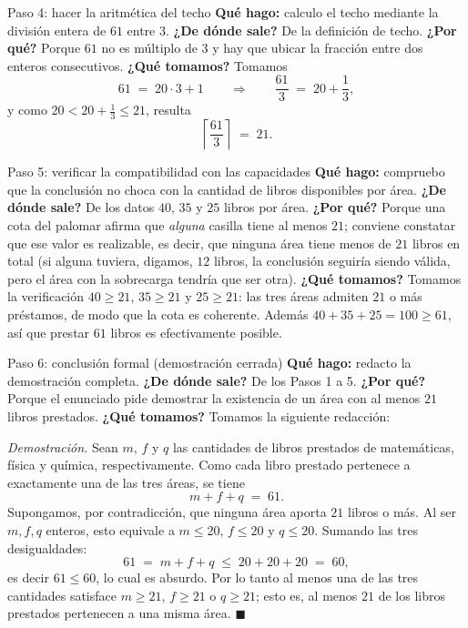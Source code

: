 \documentclass[11pt]{article}
\begin{document}
\begin{sol}
\begin{paso}{Paso 4: hacer la aritm\'etica del techo}
\textbf{Qu\'e hago:} calculo el techo mediante la divisi\'on entera de $61$ entre $3$.
\textbf{¿De d\'onde sale?} De la definici\'on de techo.
\textbf{¿Por qu\'e?} Porque $61$ no es m\'ultiplo de $3$ y hay que ubicar la fracci\'on entre dos enteros consecutivos.
\textbf{¿Qu\'e tomamos?} Tomamos
\[
61 \;=\; 20\cdot 3 + 1
\qquad\Longrightarrow\qquad
\frac{61}{3} \;=\; 20 + \frac{1}{3} ,
\]
y como $20 < 20+\tfrac{1}{3} \le 21$, resulta
\[
\left\lceil \frac{61}{3} \right\rceil \;=\; 21 .
\]
\end{paso}

\begin{paso}{Paso 5: verificar la compatibilidad con las capacidades}
\textbf{Qu\'e hago:} compruebo que la conclusi\'on no choca con la cantidad de libros disponibles por \'area.
\textbf{¿De d\'onde sale?} De los datos $40$, $35$ y $25$ libros por \'area.
\textbf{¿Por qu\'e?} Porque una cota del palomar afirma que \emph{alguna} casilla tiene al menos $21$; conviene constatar que ese valor es realizable, es decir, que ninguna \'area tiene menos de $21$ libros en total (si alguna tuviera, digamos, $12$ libros, la conclusi\'on seguir\'ia siendo v\'alida, pero el \'area con la sobrecarga tendr\'ia que ser otra).
\textbf{¿Qu\'e tomamos?} Tomamos la verificaci\'on $40\ge 21$, $35\ge 21$ y $25\ge 21$: las tres \'areas admiten $21$ o m\'as pr\'estamos, de modo que la cota es coherente. Adem\'as $40+35+25=100\ge 61$, as\'i que prestar $61$ libros es efectivamente posible.
\end{paso}

\begin{paso}{Paso 6: conclusi\'on formal (demostraci\'on cerrada)}
\textbf{Qu\'e hago:} redacto la demostraci\'on completa.
\textbf{¿De d\'onde sale?} De los Pasos 1 a 5.
\textbf{¿Por qu\'e?} Porque el enunciado pide demostrar la existencia de un \'area con al menos $21$ libros prestados.
\textbf{¿Qu\'e tomamos?} Tomamos la siguiente redacci\'on:

\medskip
\emph{Demostraci\'on.} Sean $m$, $f$ y $q$ las cantidades de libros prestados de matem\'aticas, f\'isica y qu\'imica, respectivamente. Como cada libro prestado pertenece a exactamente una de las tres \'areas, se tiene
\[
m+f+q \;=\; 61 .
\]
Supongamos, por contradicci\'on, que ninguna \'area aporta $21$ libros o m\'as. Al ser $m,f,q$ enteros, esto equivale a $m\le 20$, $f\le 20$ y $q\le 20$. Sumando las tres desigualdades:
\[
61 \;=\; m+f+q \;\le\; 20+20+20 \;=\; 60 ,
\]
es decir $61\le 60$, lo cual es absurdo. Por lo tanto al menos una de las tres cantidades satisface $m\ge 21$, $f\ge 21$ o $q\ge 21$; esto es, al menos $21$ de los libros prestados pertenecen a una misma \'area. $\blacksquare$
\end{paso}

\end{sol}
\end{document}
